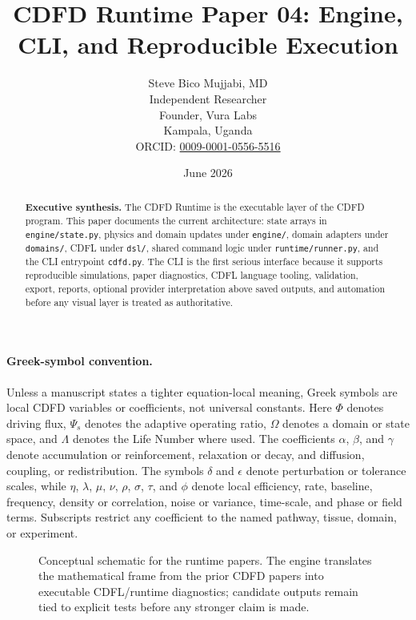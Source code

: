 \documentclass[12pt,a4paper]{article}
\title{\textbf{CDFD Runtime Paper 04: Engine, CLI, and Reproducible Execution}}
\author{Steve Bico Mujjabi, MD\\
\small Independent Researcher\\
\small Founder, Vura Labs\\
\small Kampala, Uganda\\
\small ORCID: \href{https://orcid.org/0009-0001-0556-5516}{0009-0001-0556-5516}}
\date{June 2026}
\begin{document}
\maketitle

\begin{abstract}
\noindent \textbf{Executive synthesis.} The CDFD Runtime is the executable layer
of the CDFD program. This paper documents the current architecture: state
arrays in \texttt{engine/state.py}, physics and domain updates under
\texttt{engine/}, domain adapters under \texttt{domains/}, CDFL under
\texttt{dsl/}, shared command logic under \texttt{runtime/runner.py}, and the
CLI entrypoint \texttt{cdfd.py}. The CLI is the first serious interface because
it supports reproducible simulations, paper diagnostics, CDFL language tooling,
validation, export, reports, optional provider interpretation above saved
outputs, and automation before any visual layer is treated as authoritative.
\end{abstract}

\paragraph{Greek-symbol convention.}
Unless a manuscript states a tighter equation-local meaning, Greek symbols are local CDFD variables or coefficients, not universal constants. Here $\Phi$ denotes driving flux, $\Psi_s$ denotes the adaptive operating ratio, $\Omega$ denotes a domain or state space, and $\Lambda$ denotes the Life Number where used. The coefficients $\alpha$, $\beta$, and $\gamma$ denote accumulation or reinforcement, relaxation or decay, and diffusion, coupling, or redistribution. The symbols $\delta$ and $\epsilon$ denote perturbation or tolerance scales, while $\eta$, $\lambda$, $\mu$, $\nu$, $\rho$, $\sigma$, $\tau$, and $\phi$ denote local efficiency, rate, baseline, frequency, density or correlation, noise or variance, time-scale, and phase or field terms. Subscripts restrict any coefficient to the named pathway, tissue, domain, or experiment.


\begin{figure}[ht]
\centering
{}
\caption{Conceptual schematic for the runtime papers. The engine translates the mathematical frame from the prior CDFD papers into executable CDFL/runtime diagnostics; candidate outputs remain tied to explicit tests before any stronger claim is made.}
\end{figure}
\end{document}
